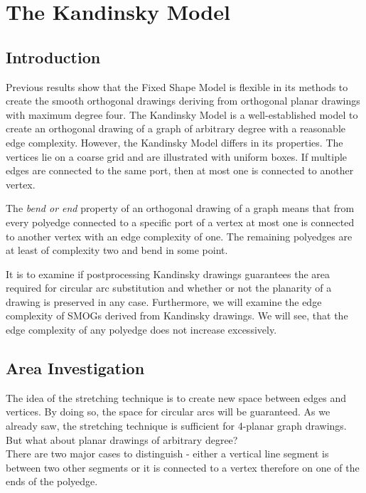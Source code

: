 \section{The Kandinsky Model}
\subsection{Introduction}
Previous results show that the Fixed Shape Model is flexible in its methods to create the smooth orthogonal drawings deriving from orthogonal planar drawings with maximum degree four. The Kandinsky Model is a well-established model to create an orthogonal drawing of a graph of arbitrary degree with a reasonable edge complexity. However, the Kandinsky Model differs in its properties. The vertices lie on a coarse grid and are illustrated with uniform boxes. If multiple edges are connected to the same port, then at most one is connected to another vertex. 
\begin{definition}
	The \textit{bend or end} property of an orthogonal drawing of a graph means that from every polyedge connected to a specific port of a vertex at most one is connected to another vertex with an edge complexity of one. The remaining polyedges are at least of complexity two and bend in some point.
\end{definition}
It is to examine if postprocessing Kandinsky drawings guarantees the area required for circular arc substitution and whether or not the planarity of a drawing is preserved in any case. Furthermore, we will examine the edge complexity of SMOGs derived from Kandinsky drawings. We will see, that the edge complexity of any polyedge does not increase excessively.
\subsection{Area Investigation}
The idea of the stretching technique is to create new space between edges and vertices. By doing so, the space for circular arcs will be guaranteed. As we already saw, the stretching technique is sufficient for 4-planar graph drawings. But what about planar drawings of arbitrary degree?\\
There are two major cases to distinguish - either a vertical line segment is between two other segments or it is connected to a vertex therefore on one of the ends of the polyedge.
